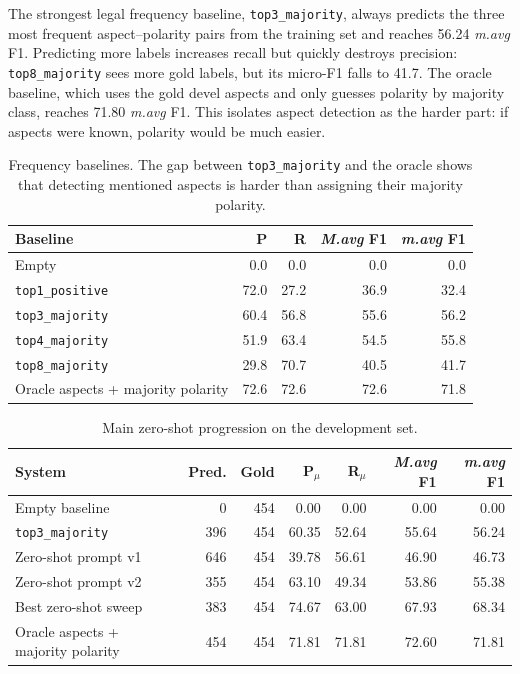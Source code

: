 \documentclass[11pt,a4paper]{article}
\newcommand{\mavg}{\textit{m.avg}}
\newcommand{\Mavg}{\textit{M.avg}}
\newcommand{\code}[1]{\texttt{#1}}
\begin{document}
The strongest legal frequency baseline, \code{top3\_majority}, always predicts the three most frequent aspect--polarity pairs from the training set and reaches 56.24 \mavg{} F1. Predicting more labels increases recall but quickly destroys precision: \code{top8\_majority} sees more gold labels, but its micro-F1 falls to 41.7. The oracle baseline, which uses the gold devel aspects and only guesses polarity by majority class, reaches 71.80 \mavg{} F1. This isolates aspect detection as the harder part: if aspects were known, polarity would be much easier.

\begin{table}[H]
    \centering
    \small
    \setlength{\tabcolsep}{5pt}
    \caption{Frequency baselines. The gap between \code{top3\_majority} and the oracle shows that detecting mentioned aspects is harder than assigning their majority polarity.}
    \label{tab:baseline_family}
    \begin{tabular}{@{}lrrrr@{}}
        \toprule
        Baseline & P & R & \Mavg{} F1 & \mavg{} F1 \\
        \midrule
        Empty & 0.0 & 0.0 & 0.0 & 0.0 \\
        \code{top1\_positive} & 72.0 & 27.2 & 36.9 & 32.4 \\
        \code{top3\_majority} & 60.4 & 56.8 & 55.6 & 56.2 \\
        \code{top4\_majority} & 51.9 & 63.4 & 54.5 & 55.8 \\
        \code{top8\_majority} & 29.8 & 70.7 & 40.5 & 41.7 \\
        Oracle aspects + majority polarity & 72.6 & 72.6 & 72.6 & 71.8 \\
        \bottomrule
    \end{tabular}
\end{table}

\begin{table}[H]
    \centering
    \small
    \setlength{\tabcolsep}{4pt}
    \caption{Main zero-shot progression on the development set.}
    \label{tab:zeroshot}
    \begin{tabular}{@{}lrrrrrr@{}}
        \toprule
        System & Pred. & Gold & P$_\mu$ & R$_\mu$ & \Mavg{} F1 & \mavg{} F1 \\
        \midrule
        Empty baseline & 0 & 454 & 0.00 & 0.00 & 0.00 & 0.00 \\
        \code{top3\_majority} & 396 & 454 & 60.35 & 52.64 & 55.64 & 56.24 \\
        Zero-shot prompt v1 & 646 & 454 & 39.78 & 56.61 & 46.90 & 46.73 \\
        Zero-shot prompt v2 & 355 & 454 & 63.10 & 49.34 & 53.86 & 55.38 \\
        Best zero-shot sweep & 383 & 454 & 74.67 & 63.00 & 67.93 & 68.34 \\
        Oracle aspects + majority polarity & 454 & 454 & 71.81 & 71.81 & 72.60 & 71.81 \\
        \bottomrule
    \end{tabular}
\end{table}
\end{document}
